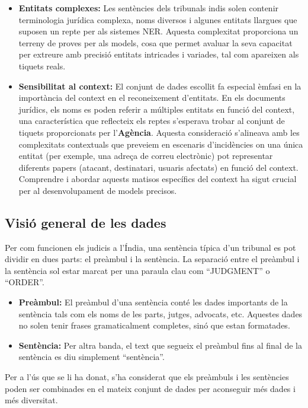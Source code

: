 \begin{itemize}
  \item \textbf{Entitats complexes:} Les sentències dels tribunals indis solen contenir terminologia jurídica complexa, noms diversos i algunes entitats llargues que suposen un repte per als sistemes NER. Aquesta complexitat proporciona un terreny de proves per als models, cosa que permet avaluar la seva capacitat per extreure amb precisió entitats intricades i variades, tal com apareixen als tiquets reals.
  \item \textbf{Sensibilitat al context:} El conjunt de dades escollit fa especial èmfasi en la importància del context en el reconeixement d'entitats. En els documents jurídics, els noms es poden referir a múltiples entitats en funció del context, una característica que reflecteix els reptes s'esperava trobar al conjunt de tiquets proporcionats per l'\textbf{Agència}. Aquesta consideració s'alineava amb les complexitats contextuals que preveiem en escenaris d'incidències on una única entitat (per exemple, una adreça de correu electrònic) pot representar diferents papers (atacant, destinatari, usuaris afectats) en funció del context. Comprendre i abordar aquests matisos específics del context ha sigut crucial per al desenvolupament de models precisos.
\end{itemize}


\subsection{Visió general de les dades}
Per com funcionen els judicis a l'Índia, una sentència típica d'un tribunal es pot dividir en dues parts: el preàmbul i la sentència. La separació entre el preàmbul i la sentència sol estar marcat per una paraula clau com ``JUDGMENT'' o ``ORDER''. 
\begin{itemize}
  \item \textbf{Preàmbul:} El preàmbul d'una sentència conté les dades importants de la sentència tals com els noms de les parts, jutges, advocats, etc. Aquestes dades no solen tenir frases gramaticalment completes, sinó que estan formatades.
  \item \textbf{Sentència:} Per altra banda, el text que segueix el preàmbul fins al final de la sentència es diu simplement ``sentència''.
\end{itemize}
Per a l'ús que se li ha donat, s'ha considerat que els preàmbuls i les sentències poden ser combinades en el mateix conjunt de dades per aconseguir més dades i més diversitat.

